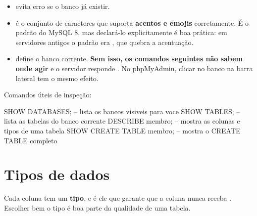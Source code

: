 \begin{itemize}
    \item {} evita erro se o banco já existir.
    \item {} é o conjunto de caracteres que suporta
          \textbf{acentos e emojis} corretamente. É o padrão do MySQL 8, mas
          declará-lo explicitamente é boa prática: em servidores antigos o
          padrão era , que quebra a acentuação.
    \item {} define o banco corrente. \textbf{Sem
          isso, os comandos seguintes não sabem onde agir} e o servidor
          responde . No phpMyAdmin,
          clicar no banco na barra lateral tem o mesmo efeito.
\end{itemize}

Comandos úteis de inspeção:

\begin{sqlcode}
SHOW DATABASES;              -- lista os bancos visiveis para voce
SHOW TABLES;                 -- lista as tabelas do banco corrente
DESCRIBE membro;             -- mostra as colunas e tipos de uma tabela
SHOW CREATE TABLE membro;    -- mostra o CREATE TABLE completo
\end{sqlcode}

\section{Tipos de dados}
\label{sec:tipos}

Cada coluna tem um \textbf{tipo}, e é ele que garante que a coluna
 nunca receba . Escolher bem o tipo é boa
parte da qualidade de uma tabela.

